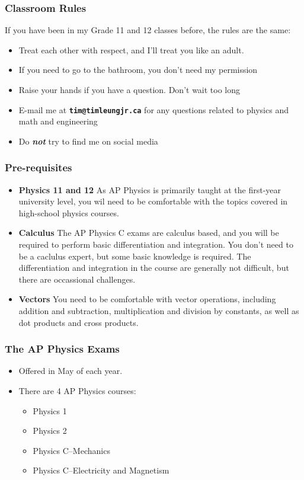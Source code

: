 \documentclass[12pt,compress,aspectratio=169]{beamer}
\begin{document}
\begin{frame}
  \frametitle{Classroom Rules}
  If you have been in my Grade 11 and 12 classes before, the rules are the
  same:
  \begin{itemize}
  \item Treat each other with respect, and I'll treat you like an adult.
  \item If you need to go to the bathroom, you don't need my permission
  \item Raise your hands if you have a question. Don't wait too long
  \item E-mail me at \textbf{\texttt{tim@timleungjr.ca}} for any questions
    related to physics and math and engineering
  \item Do \textbf{\emph{not}} try to find me on social media
  \end{itemize}
\end{frame}


\begin{frame}
  \titlepage
\end{frame}



\begin{frame}
  \frametitle{Pre-requisites}
  \begin{itemize}
  \item\textbf{Physics 11 and 12} As AP Physics is primarily taught at the
    first-year university level, you wil need to be comfortable with the topics
    covered in high-school physics courses.
  \item\textbf{Calculus} The AP Physics C exams are calculus based, and you
    will be required to perform basic differentiation and integration. You
    don't need to be a caclulus expert, but some basic knowledge is required.
    The differentiation and integration in the course are generally not
    difficult, but there are occassional challenges.
  \item\textbf{Vectors} You need to be comfortable with vector operations,
    including addition and subtraction, multiplication and division by
    constants, as well as dot products and cross products.
  \end{itemize}
\end{frame}



\begin{frame}
  \frametitle{The AP Physics Exams}
  \begin{itemize}
  \item Offered in May of each year.
  \item There are 4 AP Physics courses:
    \begin{itemize}
    \item Physics 1
    \item Physics 2
    \item Physics C--Mechanics
    \item Physics C--Electricity and Magnetism
    \end{itemize}
  \end{itemize}
\end{frame}
\end{document}
